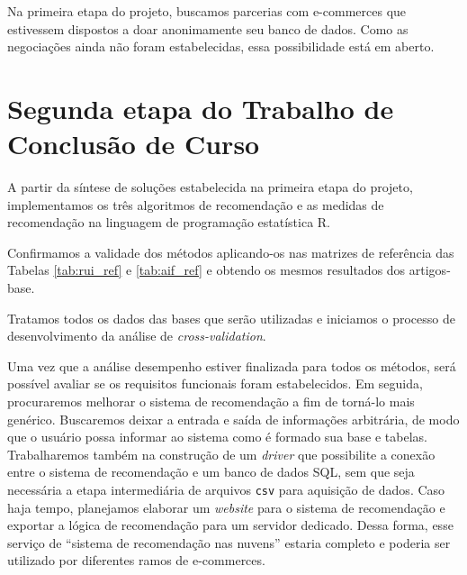 Na primeira etapa do projeto, buscamos parcerias com e-commerces que estivessem dispostos a doar anonimamente seu banco de dados. Como as negociações ainda não foram estabelecidas, essa possibilidade está em aberto.

\section{Segunda etapa do Trabalho de Conclusão de Curso} %
\label{sec:segunda_etapa_do_trabalho_de_conclus_o_de_curso}


A partir da síntese de soluções estabelecida na primeira etapa do projeto, implementamos os três algoritmos de recomendação e as medidas de recomendação na linguagem de programação estatística R.

Confirmamos a validade dos métodos aplicando-os nas matrizes de referência das Tabelas \ref{tab:rui_ref} e \ref{tab:aif_ref} e obtendo os mesmos resultados dos artigos-base.

Tratamos todos os dados das bases que serão utilizadas e iniciamos o processo de desenvolvimento da análise de \textit{cross-validation}.

Uma vez que a análise desempenho estiver finalizada para todos os métodos, será possível avaliar se os requisitos funcionais foram estabelecidos. Em seguida, procuraremos melhorar o sistema de recomendação a fim de torná-lo mais genérico. Buscaremos deixar a entrada e saída de informações arbitrária, de modo que o usuário possa informar ao sistema como é formado sua base e tabelas. Trabalharemos também na construção de um \textit{driver} que possibilite a conexão entre o sistema de recomendação e um banco de dados SQL, sem que seja necessária a etapa intermediária de arquivos \texttt{csv} para aquisição de dados. Caso haja tempo, planejamos elaborar um \textit{website} para o sistema de recomendação e exportar a lógica de recomendação para um servidor dedicado. Dessa forma, esse serviço de ``sistema de recomendação nas nuvens'' estaria completo e poderia ser utilizado por diferentes ramos de e-commerces.